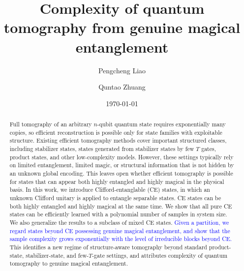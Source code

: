\documentclass[
  aps,
  prx,
  reprint,
  superscriptaddress,
  amsmath,
  amssymb,
  nofootinbib,
  longbibliography
]{revtex4-2}
\newcommand{\QZ}[1]{{{\textcolor{blue}{#1}}}}
\begin{document}
\title{Complexity of quantum tomography from genuine magical entanglement}

\author{Pengcheng Liao}

\author{Quntao Zhuang}


\date{\today}

\begin{abstract}
Full tomography of an arbitrary $n$-qubit quantum state requires exponentially many copies, so efficient reconstruction is possible only for state families with exploitable structure. Existing efficient tomography methods cover important structured classes, including stabilizer states, states generated from stabilizer states by few $T$ gates, product states, and other low-complexity models. However, these settings typically rely on limited entanglement, limited magic, or structural information that is not hidden by an unknown global encoding. This leaves open whether efficient tomography is possible for states that can appear both highly entangled and highly magical in the physical basis. In this work, we introduce Clifford-entanglable (CE) states, in which an unknown Clifford unitary is applied to entangle separable states. CE states can be both highly entangled and highly magical at the same time. We show that all pure CE states can be efficiently learned with a polynomial number of samples in system size. We also generalize the results to a subclass of mixed CE states. \QZ{Given a partition, we regard states beyond CE possessing genuine magical entanglement, and show that the sample complexity grows exponentially with the level of irreducible blocks beyond CE.} This identifies a new regime of structure-aware tomography beyond standard product-state, stabilizer-state, and few-$T$-gate settings, and attributes complexity of quantum tomography to genuine magical entanglement.


\end{abstract}

\maketitle
\end{document}
